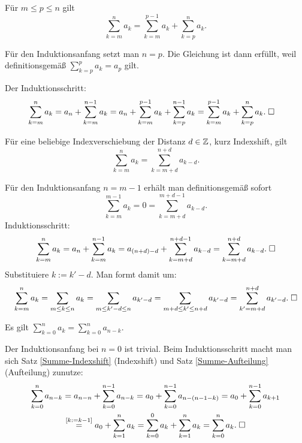 \begin{Satz}\label{Summe-Aufteilung}
Für $m\le p\le n$ gilt
\[\sum_{k=m}^n a_k = \sum_{k=m}^{p-1} a_k+\sum_{k=p}^n a_k.\]
\end{Satz}
 Für den Induktionsanfang setzt man $n=p$. Die Gleichung
ist dann erfüllt, weil definitionsgemäß $\sum_{k=p}^p a_k=a_p$
gilt.

Der Induktionsschritt:
\begin{align*}
\sum_{k=m}^n a_k &= a_n+\sum_{k=m}^{n-1} a_k
= a_n + \sum_{k=m}^{p-1} a_k + \sum_{k=p}^{n-1} a_k
= \sum_{k=m}^{p-1} a_k + \sum_{k=p}^n a_k.\;\Box
\end{align*}

\newpage
\begin{Satz}[Indexshift]\label{Summe-Indexshift}
Für eine beliebige Indexverschiebung der Distanz $d\in\mathbb Z$,
kurz Indexshift, gilt
\[\sum_{k=m}^n a_k = \sum_{k=m+d}^{n+d} a_{k-d}.\]
\end{Satz}
Für den Induktionsanfang $n=m-1$ erhält man definitionsgemäß sofort
\[\sum_{k=m}^{m-1} a_k = 0 = \sum_{k=m+d}^{m+d-1} a_{k-d}.\]
Induktionsschritt:
\begin{align*}
\sum_{k=m}^n a_k = a_n+\sum_{k=m}^{n-1} a_k
= a_{(n+d)-d}+\sum_{k=m+d}^{n+d-1} a_{k-d}
= \sum_{k=m+d}^{n+d} a_{k-d}.\;\Box
\end{align*}
 Substituiere $k:=k'-d$. Man formt damit um:
\begin{align*}
\sum_{k=m}^n a_k = \sum_{m\le k\le n} a_k
= \sum_{m\le k'-d\le n} a_{k'-d}
= \sum_{m+d\le k'\le n+d} a_{k'-d}
= \sum_{k'=m+d}^{n+d} a_{k'-d}.\;\Box
\end{align*}

\begin{Satz}\label{Summe-Umkehrung}
Es gilt $\sum_{k=0}^n a_k = \sum_{k=0}^n a_{n-k}$.
\end{Satz}
Der Induktionsanfang bei $n=0$ ist trivial. Beim Induktionsschritt
macht man sich Satz \ref{Summe-Indexshift} (Indexshift) und
Satz \ref{Summe-Aufteilung} (Aufteilung) zunutze:
\begin{gather*}
\sum_{k=0}^n a_{n-k} = a_{n-n}+\sum_{k=0}^{n-1} a_{n-k}
= a_0+\sum_{k=0}^{n-1} a_{n-(n-1-k)}
= a_0+\sum_{k=0}^{n-1} a_{k+1}\\
\stackrel{[k:=k-1]}= a_0+\sum_{k=1}^n a_k
= \sum_{k=0}^0 a_k + \sum_{k=1}^n a_k
= \sum_{k=0}^n a_k.\;\Box
\end{gather*}

